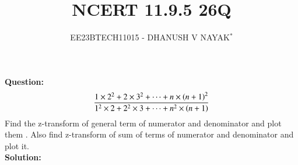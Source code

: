 \documentclass[journal,12pt,twocolumn]{IEEEtran}
\theoremstyle{remark}
\begin{document}

\vspace{3cm}

\title{NCERT 11.9.5 26Q}
\author{EE23BTECH11015 - DHANUSH V NAYAK$^{*}$%
}
\maketitle
\newpage
\bigskip

\renewcommand{\thefigure}{\arabic{figure}}
\renewcommand{\thetable}{\theenumi}


\textbf{Question:}
\begin{align}
    \frac{1\times2^2 + 2\times3^2 + \dots + n\times\left(n+1\right)^{2}}{1^2\times2 + 2^2\times3 + \dots + n^2\times \left(n+1\right)}\notag 
\end{align}
Find the z-transform of general term of numerator and denominator and plot them . Also find z-transform of sum of terms of numerator and denominator and plot it.\\ 
\textbf{Solution:}

\end{document}
